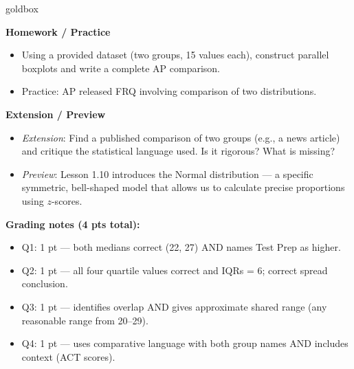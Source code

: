 \documentclass[10pt]{article}
\begin{document}
\boxguard
\begin{skillbox}{goldbox}
\begin{minipage}[t]{0.48\linewidth}
    \textbf{Homework / Practice}
    \begin{itemize}
        \item Using a provided dataset (two groups, 15 values each), construct parallel boxplots and write a complete AP comparison.
        \item Practice: AP released FRQ involving comparison of two distributions.
    \end{itemize}
\end{minipage}
\hfill
\begin{minipage}[t]{0.48\linewidth}
    \textbf{Extension / Preview}
    \begin{itemize}
        \item \textit{Extension}: Find a published comparison of two groups (e.g., a news article) and critique the statistical language used. Is it rigorous? What is missing?
        \item \textit{Preview}: Lesson 1.10 introduces the Normal distribution --- a specific symmetric, bell-shaped model that allows us to calculate precise proportions using $z$-scores.
    \end{itemize}
\end{minipage}
\end{skillbox}



\boxguard
\begin{teachernote}[Warm-Up]
\textbf{Grading notes (4 pts total):}
\begin{itemize}[itemsep=2pt]
  \item Q1: 1 pt --- both medians correct (22, 27) AND names Test Prep as higher.
  \item Q2: 1 pt --- all four quartile values correct and IQRs = 6; correct spread conclusion.
  \item Q3: 1 pt --- identifies overlap AND gives approximate shared range (any reasonable range from 20--29).
  \item Q4: 1 pt --- uses comparative language with both group names AND includes context (ACT scores).
\end{itemize}
\end{teachernote}
\end{document}
